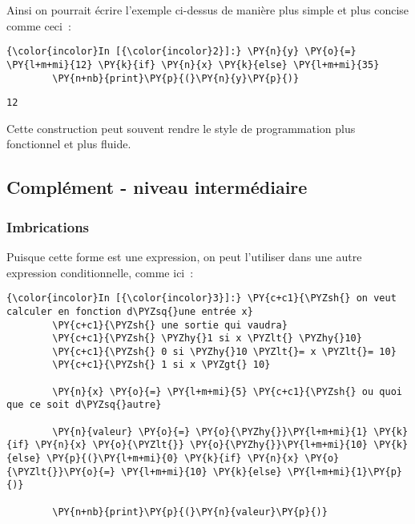     Ainsi on pourrait écrire l'exemple ci-dessus de manière plus simple et
plus concise comme ceci~:

    \begin{Verbatim}[commandchars=\\\{\},frame=single,framerule=0.3mm,rulecolor=\color{cellframecolor}]
{\color{incolor}In [{\color{incolor}2}]:} \PY{n}{y} \PY{o}{=} \PY{l+m+mi}{12} \PY{k}{if} \PY{n}{x} \PY{k}{else} \PY{l+m+mi}{35}
        \PY{n+nb}{print}\PY{p}{(}\PY{n}{y}\PY{p}{)}
\end{Verbatim}


    \begin{Verbatim}[commandchars=\\\{\},frame=single,framerule=0.3mm,rulecolor=\color{cellframecolor}]
12
\end{Verbatim}

    Cette construction peut souvent rendre le style de programmation plus
fonctionnel et plus fluide.

    \hypertarget{compluxe9ment---niveau-intermuxe9diaire}{%
\subsection{Complément - niveau
intermédiaire}\label{compluxe9ment---niveau-intermuxe9diaire}}

    \hypertarget{imbrications}{%
\subsubsection{Imbrications}\label{imbrications}}

    Puisque cette forme est une expression, on peut l'utiliser dans une
autre expression conditionnelle, comme ici~:

    \begin{Verbatim}[commandchars=\\\{\},frame=single,framerule=0.3mm,rulecolor=\color{cellframecolor}]
{\color{incolor}In [{\color{incolor}3}]:} \PY{c+c1}{\PYZsh{} on veut calculer en fonction d\PYZsq{}une entrée x}
        \PY{c+c1}{\PYZsh{} une sortie qui vaudra}
        \PY{c+c1}{\PYZsh{} \PYZhy{}1 si x \PYZlt{} \PYZhy{}10}
        \PY{c+c1}{\PYZsh{} 0 si \PYZhy{}10 \PYZlt{}= x \PYZlt{}= 10}
        \PY{c+c1}{\PYZsh{} 1 si x \PYZgt{} 10}
        
        \PY{n}{x} \PY{o}{=} \PY{l+m+mi}{5} \PY{c+c1}{\PYZsh{} ou quoi que ce soit d\PYZsq{}autre}
        
        \PY{n}{valeur} \PY{o}{=} \PY{o}{\PYZhy{}}\PY{l+m+mi}{1} \PY{k}{if} \PY{n}{x} \PY{o}{\PYZlt{}} \PY{o}{\PYZhy{}}\PY{l+m+mi}{10} \PY{k}{else} \PY{p}{(}\PY{l+m+mi}{0} \PY{k}{if} \PY{n}{x} \PY{o}{\PYZlt{}}\PY{o}{=} \PY{l+m+mi}{10} \PY{k}{else} \PY{l+m+mi}{1}\PY{p}{)}
        
        \PY{n+nb}{print}\PY{p}{(}\PY{n}{valeur}\PY{p}{)}
\end{Verbatim}


